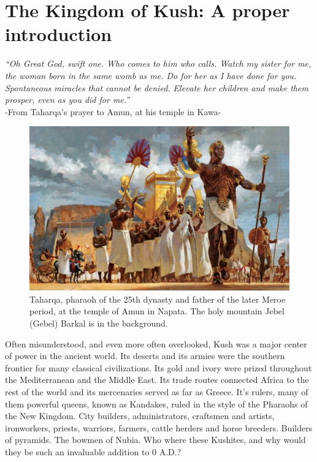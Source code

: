 \documentclass[a4paper,12pt]{scrreprt}
\begin{document}
\chapter{The Kingdom of Kush: A proper introduction}

\begin{center}
\textit{“Oh Great God, swift one. Who comes to him who calls. Watch my sister for me, the woman born in the same womb as me. Do for her as I have done for you. Spontaneous miracles that cannot be denied. Elevate her children and make them prosper, even as you did for me.”}\\[12pt]

\noindent
-From Taharqa’s prayer to Amun, at his temple in Kawa-
\end{center}

\begin{figure}[H]
	\centering
	\includegraphics[width=\textwidth]{img/taharqa_pharaoh}
	\caption{Taharqa, pharaoh of the 25th dynasty and father of the later Meroe period, at the temple of Amun in Napata. The holy mountain Jebel (Gebel) Barkal is in the background.}
\end{figure}

Often misunderstood, and even more often overlooked, Kush was a major center of power in the ancient world. Its deserts and its armies were the southern frontier for many classical civilizations. Its gold and ivory were prized throughout the Mediterranean and the Middle East. Its trade routes connected Africa to the rest of the world and its mercenaries served as far as Greece. It’s rulers, many of them powerful queens, known as Kandakes, ruled in the style of the Pharaohs of the New Kingdom. City builders, administrators, craftsmen and artists, ironworkers, priests, warriors, farmers, cattle herders and horse breeders. Builders of pyramids. The bowmen of Nubia. Who where these Kushites, and why would they be such an invaluable addition to 0 A.D.?
\end{document}
